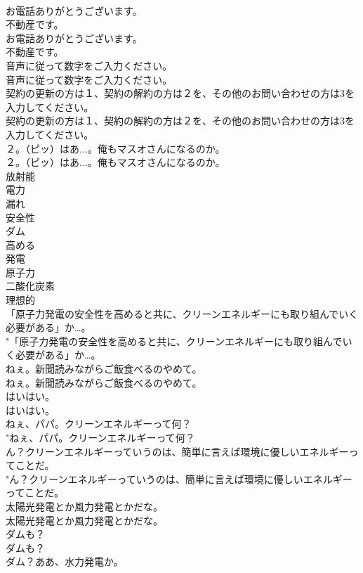 \documentclass[8pt]{extreport}
\begin{document}
\begin{CJK}{UTF8}{min}
\\	お電話ありがとうございます。
\\	不動産です。	
\\	お電話ありがとうございます。
\\	不動産です。 
\\	音声に従って数字をご入力ください。	
\\	音声に従って数字をご入力ください。 
\\	契約の更新の方は１、契約の解約の方は２を、その他のお問い合わせの方は3を入力してください。	
\\	契約の更新の方は１、契約の解約の方は２を、その他のお問い合わせの方は3を入力してください。 
\\	２。（ピッ）はあ...。俺もマスオさんになるのか。	
\\	２。（ピッ）はあ...。俺もマスオさんになるのか。 
\\	放射能
\\	電力
\\	漏れ
\\	安全性
\\	ダム
\\	高める
\\	発電
\\	原子力
\\	二酸化炭素
\\	理想的
\\	「原子力発電の安全性を高めると共に、クリーンエネルギーにも取り組んでいく必要がある」か…。	
\\	"「原子力発電の安全性を高めると共に、クリーンエネルギーにも取り組んでいく必要がある」か…。 
\\	ねぇ。新聞読みながらご飯食べるのやめて。	
\\	ねぇ。新聞読みながらご飯食べるのやめて。 
\\	はいはい。	
\\	はいはい。 
\\	ねぇ、パパ。クリーンエネルギーって何？	
\\	"ねぇ、パパ。クリーンエネルギーって何？ 
\\	ん？クリーンエネルギーっていうのは、簡単に言えば環境に優しいエネルギーってことだ。	
\\	"ん？クリーンエネルギーっていうのは、簡単に言えば環境に優しいエネルギーってことだ。 
\\	太陽光発電とか風力発電とかだな。	
\\	太陽光発電とか風力発電とかだな。 
\\	ダムも？	
\\	ダムも？ 
\\	ダム？ああ、水力発電か。	

\end{CJK}
\end{document}
